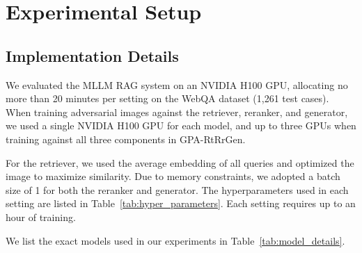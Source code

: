 \appendix
\onecolumn


\section{Experimental Setup}

\subsection{Implementation Details}
\label{appendix:implementation_details}
We evaluated the MLLM RAG system on an NVIDIA H100 GPU, allocating no more than 20 minutes per setting on the WebQA dataset (1,261 test cases). When training adversarial images against the retriever, reranker, and generator, we used a single NVIDIA H100 GPU for each model, and up to three GPUs when training against all three components in GPA-RtRrGen.

For the retriever, we used the average embedding of all queries and optimized the image to maximize similarity. Due to memory constraints, we adopted a batch size of 1 for both the reranker and generator. 
The hyperparameters used in each setting are listed in Table~\ref{tab:hyper_parameters}. Each setting requires up to an hour of training.

We list the exact models used in our experiments in Table~\ref{tab:model_details}.












